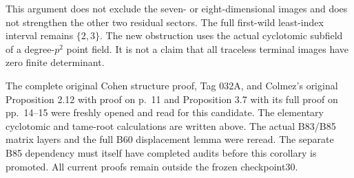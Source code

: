 \begin{remark}
\label{rem:B-RD86-scope}
This argument does not exclude the seven- or
eight-dimensional images and does not strengthen the
other two residual sectors. The full first-wild
least-index interval remains \(\{2,3\}\).
The new obstruction uses the actual cyclotomic
subfield of a degree-\(p^2\) point field. It is not a
claim that all traceless terminal images have zero
finite determinant.

The complete original Cohen structure proof, Tag 032A,
and Colmez's original Proposition 2.12 with proof on
p.~11 and Proposition 3.7 with its full proof on
pp.~14--15 were freshly opened and read for this
candidate. The elementary cyclotomic and tame-root
calculations are written above. The actual B83/B85
matrix layers and the full B60 displacement lemma
were reread. The separate B85 dependency must itself
have completed audits before this corollary is
promoted. All current proofs remain outside the
frozen checkpoint30.
\end{remark}
